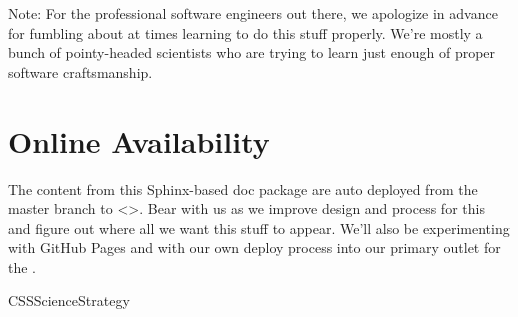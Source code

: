 \documentclass[letterpaper,10pt,english]{sphinxmanual}
\begin{document}
\begin{DUlineblock}{0em}
\item[] Note: For the professional software engineers out there, we apologize in advance for fumbling about at times learning to do this stuff properly. We’re mostly a bunch of pointy-headed scientists who are trying to learn just enough of proper software craftsmanship.
\end{DUlineblock}


\chapter{Online Availability}
\label{\detokenize{index:online-availability}}
The content from this Sphinx-based doc package are auto deployed from the master branch to \textless{}\textgreater{}. Bear with us as we improve design and process for this and figure out where all we want this stuff to appear. We’ll also be experimenting with GitHub Pages and with our own deploy process into our primary outlet for the .

\begin{sphinxthebibliography}{CSSScienceStrategy}
\end{sphinxthebibliography}



\renewcommand{\indexname}{Index}
\printindex
\end{document}
